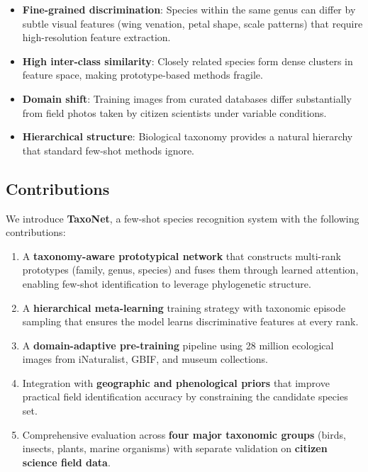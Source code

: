 \begin{itemize}
  \item \textbf{Fine-grained discrimination}: Species within the same
    genus can differ by subtle visual features (wing venation, petal
    shape, scale patterns) that require high-resolution feature
    extraction.
  \item \textbf{High inter-class similarity}: Closely related species
    form dense clusters in feature space, making prototype-based
    methods fragile.
  \item \textbf{Domain shift}: Training images from curated databases
    differ substantially from field photos taken by citizen scientists
    under variable conditions.
  \item \textbf{Hierarchical structure}: Biological taxonomy provides a
    natural hierarchy that standard few-shot methods ignore.
\end{itemize}

\subsection{Contributions}

We introduce \textbf{TaxoNet}, a few-shot species recognition system
with the following contributions:

\begin{enumerate}
  \item A \textbf{taxonomy-aware prototypical network} that constructs
    multi-rank prototypes (family, genus, species) and fuses them
    through learned attention, enabling few-shot identification to
    leverage phylogenetic structure.

  \item A \textbf{hierarchical meta-learning} training strategy with
    taxonomic episode sampling that ensures the model learns
    discriminative features at every rank.

  \item A \textbf{domain-adaptive pre-training} pipeline using 28
    million ecological images from iNaturalist, GBIF, and museum
    collections.

  \item Integration with \textbf{geographic and phenological priors}
    that improve practical field identification accuracy by
    constraining the candidate species set.

  \item Comprehensive evaluation across \textbf{four major taxonomic
    groups} (birds, insects, plants, marine organisms) with separate
    validation on \textbf{citizen science field data}.
\end{enumerate}

